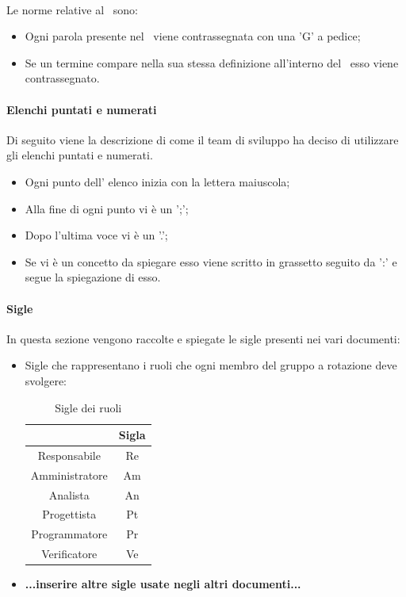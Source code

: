 \paragraph{\docNameGlo}
Le norme relative al \docNameGloLow\ sono:
\begin{itemize}
    \item Ogni parola presente nel \docNameGloLow\ viene contrassegnata con una 'G' a pedice;
    \item Se un termine compare nella sua stessa definizione all'interno del \docNameGloLow\ esso viene contrassegnato.
\end{itemize}

\paragraph{Elenchi puntati e numerati}
Di seguito viene la descrizione di come il team di sviluppo ha deciso di utilizzare gli elenchi puntati e numerati.
\begin {itemize}
    \item Ogni punto dell' elenco inizia con la lettera maiuscola;
    \item Alla fine di ogni punto vi è un ';';
    \item Dopo l'ultima voce vi è un '.';
    \item Se vi è un concetto da spiegare esso viene scritto in grassetto seguito da ':' e segue la spiegazione di esso.
\end {itemize}
\paragraph{Sigle}
In questa sezione vengono raccolte e spiegate le sigle presenti nei vari documenti:
\begin{itemize}
    \item Sigle che rappresentano i ruoli che ogni membro del gruppo a rotazione deve svolgere:
    \begin{table}[H]
        \centering
        \renewcommand{\arraystretch}{1.8}
        \begin{tabular}{c|c}
          \rowcolor[HTML]{125E28} 
          \multicolumn{1}{c}{\color[HTML]{FFFFFF}\textbf{Ruolo}}
          & \multicolumn{1}{c}{\color[HTML]{FFFFFF}\textbf{Sigla}}\\
          \hline
          Responsabile      & Re\\
          Amministratore    & Am\\
          Analista          & An\\
          Progettista       & Pt\\
          Programmatore     & Pr\\
          Verificatore      & Ve
        \end{tabular}
        \caption{Sigle dei ruoli}
      \end{table}
    \item\textbf{...inserire altre sigle usate negli altri documenti...}
\end{itemize}
